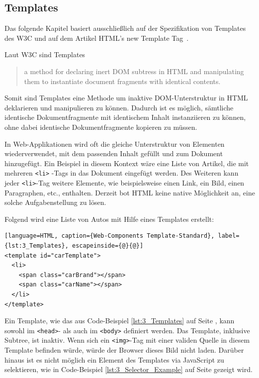 \subsection{Templates}
\label{sec:3_WC_Templates}

Das folgende Kapitel basiert ausschließlich auf der Spezifikation von Templates des W3C \citereset \autocite[siehe][]{Weinstein.2013} und auf dem Artikel \glqq HTML's new Template Tag\grqq\ \citereset \autocite[siehe][]{BidelmanTemplate.2013}.

Laut W3C sind Templates
\begin{quote}
\glqq
  a method for declaring inert DOM subtress in HTML and manipulating them to instantiate document fragments with identical contents.
\grqq
\end{quote}
Somit sind Templates eine Methode um inaktive DOM-Unterstruktur in HTML deklarieren und manipulieren zu können. Dadurch ist es möglich, sämtliche identische Dokumentfragmente mit identischem Inhalt instanziieren zu können, ohne dabei identische Dokumentfragmente kopieren zu müssen.

In Web-Applikationen wird oft die gleiche Unterstruktur von Elementen wiederverwendet, mit dem passenden Inhalt gefüllt und zum Dokument hinzugefügt. Ein Beispiel in diesem Kontext wäre eine Liste von Artikel, die mit mehreren \lstinline|<li>| -Tags in das Dokument eingefügt werden. Des Weiteren kann jeder \lstinline|<li>|-Tag weitere Elemente, wie beispielsweise einen Link, ein Bild, einen Paragraphen, etc., enthalten. Derzeit bot HTML keine native Möglichkeit an, eine solche Aufgabenstellung zu lösen.

Folgend wird eine Liste von Autos mit Hilfe eines Templates erstellt:
\begin{lstlisting}[language=HTML, caption={Web-Components Template-Standard}, label={lst:3_Templates}, escapeinside={@}{@}]
<template id="carTemplate">
  <li>
    <span class="carBrand"></span>
    <span class="carName"></span>
  </li>
</template>
\end{lstlisting}

Ein Template, wie das aus Code-Beispiel \ref{lst:3_Templates} auf Seite \pageref{lst:3_Templates}, kann sowohl im \lstinline|<head>|- als auch im \lstinline|<body>| definiert werden. Das Template, inklusive Subtree, ist inaktiv. Wenn sich ein \lstinline|<img>|-Tag mit einer validen Quelle in diesem Template befinden würde, würde der Browser dieses Bild nicht laden. Darüber hinaus ist es nicht möglich ein Element des Templates via JavaScript zu selektieren, wie in Code-Beispiel \ref{lst:3_Selector_Example} auf Seite \pageref{lst:3_Selector_Example} gezeigt wird.

